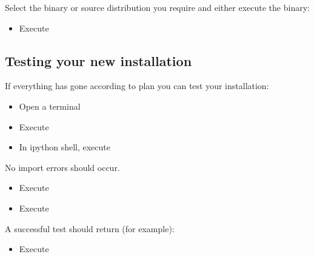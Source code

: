 \documentclass[letterpaper,10pt,english]{sphinxmanual}
\begin{document}
\sphinxAtStartPar
Select the binary or source distribution you require and either execute the binary:
\begin{itemize}
\item {} 
\sphinxAtStartPar
Execute 

\end{itemize}


\subsection{Testing your new installation}
\label{\detokenize{install_doc:testing-your-new-installation}}
\sphinxAtStartPar
If everything has gone according to plan you can test your installation:
\begin{itemize}
\item {} 
\sphinxAtStartPar
Open a terminal

\item {} 
\sphinxAtStartPar
Execute 

\item {} 
\sphinxAtStartPar
In ipython shell, execute 

\end{itemize}

\sphinxAtStartPar
No import errors should occur.
\begin{itemize}
\item {} 
\sphinxAtStartPar
Execute 

\item {} 
\sphinxAtStartPar
Execute 

\end{itemize}

\sphinxAtStartPar
A successful test should return (for example):

\begin{sphinxVerbatim}[commandchars=\\\{\}]
  
 
\end{sphinxVerbatim}
\begin{itemize}
\item {} 
\sphinxAtStartPar
Execute 

\end{itemize}
\end{document}
